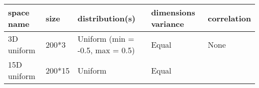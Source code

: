 \documentclass[]{article}
\begin{document}
\begin{longtable}[]{@{}lllll@{}}
\toprule
\begin{minipage}[b]{0.12\columnwidth}\raggedright\strut
space name\strut
\end{minipage} & \begin{minipage}[b]{0.08\columnwidth}\raggedright\strut
size\strut
\end{minipage} & \begin{minipage}[b]{0.31\columnwidth}\raggedright\strut
distribution(s)\strut
\end{minipage} & \begin{minipage}[b]{0.21\columnwidth}\raggedright\strut
dimensions variance\strut
\end{minipage} & \begin{minipage}[b]{0.13\columnwidth}\raggedright\strut
correlation\strut
\end{minipage}\tabularnewline
\midrule
\endhead
\begin{minipage}[t]{0.12\columnwidth}\raggedright\strut
3D uniform\strut
\end{minipage} & \begin{minipage}[t]{0.08\columnwidth}\raggedright\strut
200*3\strut
\end{minipage} & \begin{minipage}[t]{0.31\columnwidth}\raggedright\strut
Uniform (min = -0.5, max = 0.5)\strut
\end{minipage} & \begin{minipage}[t]{0.21\columnwidth}\raggedright\strut
Equal\strut
\end{minipage} & \begin{minipage}[t]{0.13\columnwidth}\raggedright\strut
None\strut
\end{minipage}\tabularnewline
\begin{minipage}[t]{0.12\columnwidth}\raggedright\strut
15D uniform\strut
\end{minipage} & \begin{minipage}[t]{0.08\columnwidth}\raggedright\strut
200*15\strut
\end{minipage} & \begin{minipage}[t]{0.31\columnwidth}\raggedright\strut
Uniform\strut
\end{minipage} & \begin{minipage}[t]{0.21\columnwidth}\raggedright\strut
Equal\strut
\end{minipage} & \begin{minipage}[t]{0.13\columnwidth}\raggedright\strut

\end{minipage}
\end{longtable}
\end{document}
